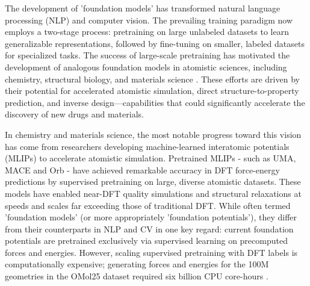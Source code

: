 
The development of 'foundation models' has transformed natural language processing (NLP) and computer vision. The prevailing training paradigm now employs a two-stage process: pretraining on large unlabeled datasets to learn generalizable representations, followed by fine-tuning on smaller, labeled datasets for specialized tasks. The success of large-scale pretraining has motivated the development of analogous foundation models in atomistic sciences, including chemistry, structural biology, and materials science \cite{AtomisticfFoundationModels_yuan2025, AI4sci_review_zhang2025artificial}. These efforts are driven by their potential for accelerated atomistic simulation, direct structure-to-property prediction, and inverse design—capabilities that could significantly accelerate the discovery of new drugs and materials.

In chemistry and materials science, the most notable progress toward this vision has come from researchers developing machine-learned interatomic potentials (MLIPs) to accelerate atomistic simulation. Pretrained MLIPs - such as UMA\cite{UMA_wood2025}, MACE\cite{MACE_batatia2025} and Orb\cite{Orbv3_rhodes2025} - have achieved remarkable accuracy in DFT force-energy predictions by supervised pretraining on large, diverse atomistic datasets. These models have enabled near-DFT quality simulations and structural relaxations at speeds and scales far exceeding those of traditional DFT. While often termed 'foundation models' (or more appropriately 'foundation potentials'), they differ from their counterparts in NLP and CV in one key regard: current foundation potentials are pretrained exclusively via supervised learning on precomputed forces and energies. However, scaling supervised pretraining with DFT labels is computationally expensive; generating forces and energies for the 100M geometries in the OMol25 dataset required six billion CPU core-hours \cite{OMOL25_levine2025open}.

